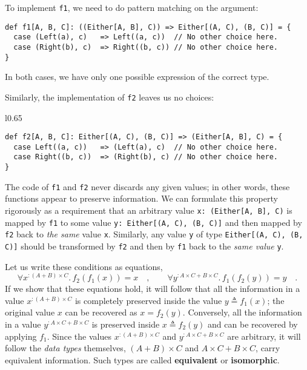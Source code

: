To implement \lstinline!f1!, we need to do pattern matching on the
argument:
\begin{lstlisting}
def f1[A, B, C]: ((Either[A, B], C)) => Either[(A, C), (B, C)] = {
  case (Left(a), c)   => Left((a, c))  // No other choice here.
  case (Right(b), c)  => Right((b, c)) // No other choice here.
}
\end{lstlisting}
In both cases, we have only one possible expression of the correct
type.

Similarly, the implementation of \lstinline!f2! leaves us no choices:

\begin{wrapfigure}{l}{0.65\columnwidth}%
\vspace{-0.5\baselineskip}
\begin{lstlisting}
def f2[A, B, C]: Either[(A, C), (B, C)] => (Either[A, B], C) = {
  case Left((a, c))   => (Left(a), c)  // No other choice here.
  case Right((b, c))  => (Right(b), c) // No other choice here.
}
\end{lstlisting}
\vspace{-0.9\baselineskip}
\end{wrapfigure}%

\noindent The code of \lstinline!f1! and \lstinline!f2! never discards
any given values; in other words, these functions appear to preserve
information. We can formulate this property rigorously as a requirement
that an arbitrary value \lstinline!x: (Either[A, B], C)! is mapped
by \lstinline!f1! to some value \lstinline!y: Either[(A, C), (B, C)]!
and then mapped by \lstinline!f2! back to \emph{the same} value \lstinline!x!.
Similarly, any value \lstinline!y! of type \lstinline!Either[(A, C), (B, C)]!
should be transformed by \lstinline!f2! and then by \lstinline!f1!
back to the \emph{same value} \lstinline!y!. 

Let us write these conditions as equations,
\[
\forall x^{:(A+B)\times C}.\,f_{2}(f_{1}(x))=x\quad,\quad\quad\forall y^{:A\times C+B\times C}.\,f_{1}\left(f_{2}(y)\right)=y\quad.
\]
If we show that these equations hold, it will follow that all the
information in a value $x^{:(A+B)\times C}$ is completely preserved
inside the value $y\triangleq f_{1}(x)$; the original value $x$
can be recovered as $x=f_{2}(y)$. Conversely, all the information
in a value $y^{:A\times C+B\times C}$ is preserved inside $x\triangleq f_{2}(y)$
and can be recovered by applying $f_{1}$. Since the values $x^{:(A+B)\times C}$
and $y^{:A\times C+B\times C}$ are arbitrary, it will follow the
\emph{data types} themselves, $\left(A+B\right)\times C$ and $A\times C+B\times C$,
carry equivalent information. Such types are called \textbf{equivalent}
or \textbf{isomorphic}.

